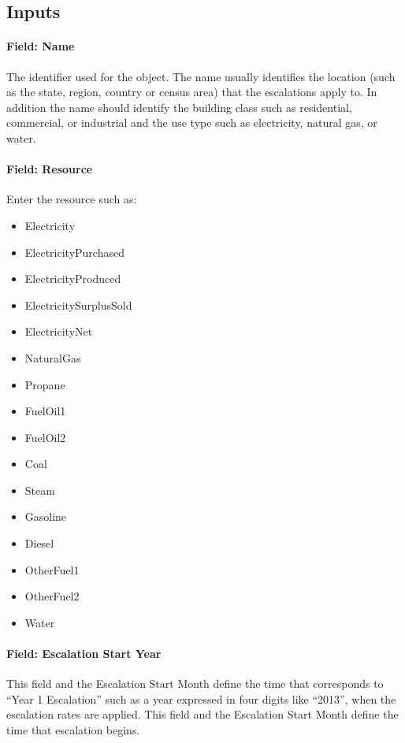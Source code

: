 \subsection{Inputs}\label{inputs-061}

\paragraph{Field: Name}\label{field-name-059}

The identifier used for the object. The name usually identifies the location (such as the state, region, country or census area) that the escalations apply to. In addition the name should identify the building class such as residential, commercial, or industrial and the use type such as electricity, natural gas, or water.

\paragraph{Field: Resource}\label{field-resource-000}

Enter the resource such as:

\begin{itemize}
\item
  Electricity
\item
  ElectricityPurchased
\item
  ElectricityProduced
\item
  ElectricitySurplusSold
\item
  ElectricityNet
\item
  NaturalGas
\item
  Propane
\item
  FuelOil1
\item
  FuelOil2
\item
  Coal
\item
  Steam
\item
  Gasoline
\item
  Diesel
\item
  OtherFuel1
\item
  OtherFuel2
\item
  Water
\end{itemize}

\paragraph{Field: Escalation Start Year}\label{field-escalation-start-year}

This field and the Escalation Start Month define the time that corresponds to ``Year 1 Escalation'' such as a year expressed in four digits like ``2013'', when the escalation rates are applied. This field and the Escalation Start Month define the time that escalation begins.


